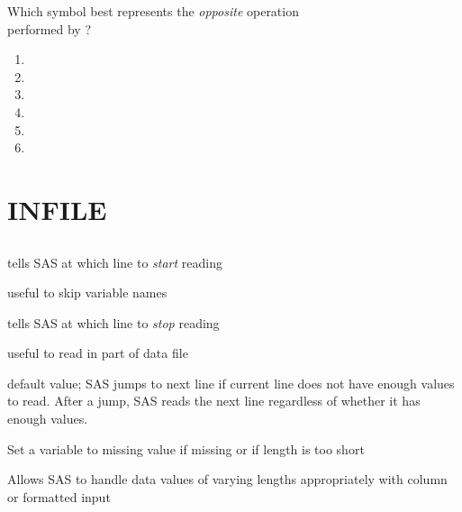 \begin{frame}
\begin{clicker}{Which symbol best represents the \emph{opposite} operation\\ performed by ?}
\begin{enumerate}
\item {}
\item {}
\item {}
\item {}
\item \ttt{\&}
\item \ttt{:}
\end{enumerate}
\end{clicker}
\end{frame}

\section[INFILE]{INFILE}
\subsection{}
\begin{frame}
\end{frame}

\begin{frame}
\bi
\item {} tells SAS at which line to \emph{start} reading
\item[] useful to skip variable names
\item {} tells SAS at which line to \emph{stop} reading
\item[] useful to read in part of data file
\item {} default value; SAS jumps to next line if current line does not have enough values to read.  After a jump, SAS reads the next line regardless of whether it has enough values.
\item {} Set a variable to missing value if missing or if length is too short
\item {} Allows SAS to handle data values of varying lengths appropriately with column or formatted input
\ei
\end{frame}

